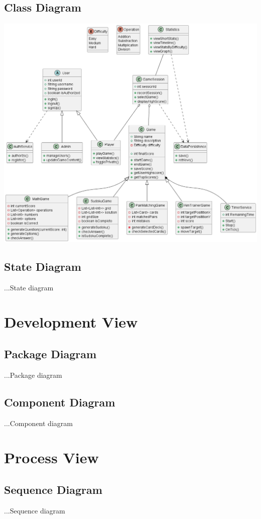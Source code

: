 \documentclass[11pt,a4paper]{article}
\begin{document}
\subsection*{Class Diagram}
    \includegraphics[width=\textwidth]{out/Diagrams/class_diagram/class_diagram.png}

\subsection*{State Diagram}
...State diagram

\section{Development View}

\subsection*{Package Diagram}
...Package diagram

\subsection*{Component Diagram}
...Component diagram

\section{Process View}

\subsection*{Sequence Diagram}
...Sequence diagram
\end{document}
